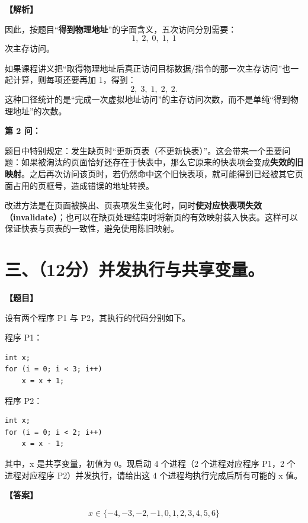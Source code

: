 \documentclass[UTF8,12pt]{ctexart}
\newenvironment{question}{\par\medskip\noindent\textbf{【题目】}\par\smallskip}{\par\medskip}
\newenvironment{explanation}{\par\noindent\textbf{【解析】}\par\smallskip}{\par\medskip}
\newenvironment{answer}{\par\noindent\textbf{【答案】}\par\smallskip}{\par}
\begin{document}
\begin{explanation}
因此，按题目“\textbf{得到物理地址}”的字面含义，五次访问分别需要：
\[
\boxed{1,\;2,\;0,\;1,\;1}
\]
次主存访问。

如果课程讲义把“取得物理地址后真正访问目标数据/指令的那一次主存访问”也一起计算，则每项还要再加 1，得到：
\[
\boxed{2,\;3,\;1,\;2,\;2}.
\]
这种口径统计的是“完成一次虚拟地址访问”的主存访问次数，而不是单纯“得到物理地址”的次数。

\medskip
\textbf{第 2 问：}

题目中特别规定：发生缺页时“更新页表（不更新快表）”。这会带来一个重要问题：如果被淘汰的页面恰好还存在于快表中，那么它原来的快表项会变成\textbf{失效的旧映射}。之后再次访问该页时，若仍然命中这个旧快表项，就可能得到已经被其它页面占用的页框号，造成错误的地址转换。

改进方法是在页面被换出、页表项发生变化时，同时\textbf{使对应快表项失效（invalidate）}；也可以在缺页处理结束时将新页的有效映射装入快表。这样可以保证快表与页表的一致性，避免使用陈旧映射。
\end{explanation}

\section*{三、（12分）并发执行与共享变量。}

\begin{question}
设有两个程序 P1 与 P2，其执行的代码分别如下。

程序 P1：
\begin{lstlisting}
int x;
for (i = 0; i < 3; i++)
    x = x + 1;
\end{lstlisting}

程序 P2：
\begin{lstlisting}
int x;
for (i = 0; i < 2; i++)
    x = x - 1;
\end{lstlisting}

其中，x 是共享变量，初值为 0。现启动 4 个进程（2 个进程对应程序 P1，2 个进程对应程序 P2）并发执行，请给出这 4 个进程均执行完成后所有可能的 x 值。
\end{question}

\begin{answer}
\[
\boxed{x\in\{-4,-3,-2,-1,0,1,2,3,4,5,6\}}
\]
\end{answer}
\end{document}
